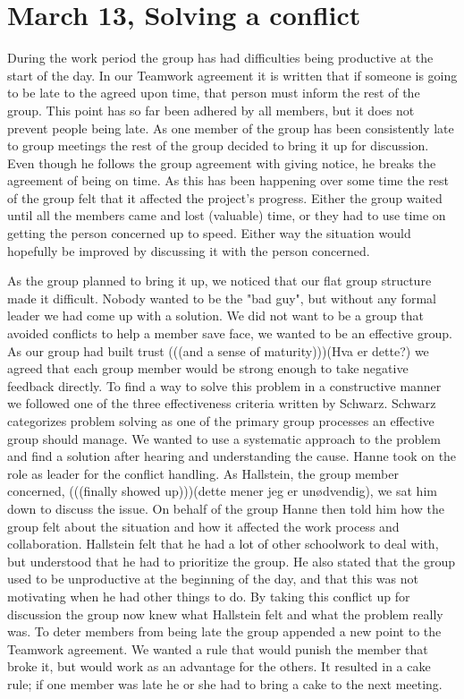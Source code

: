 \section{March 13, Solving a conflict}

During the work period the group has had difficulties being productive at the start of the day. In our Teamwork agreement it is written that if someone is going to be late to the agreed upon time, that person must inform the rest of the group. This point has so far been adhered by all members, but it does not prevent people being late. As one member of the group has been consistently  late to group meetings the rest of the group decided to bring it up for discussion. Even though he follows the group agreement with giving notice, he breaks the agreement of being on time. As this has been happening over some time the rest of the group felt that it affected the project's progress. Either the group waited until all the members came and lost (valuable) time, or they had to use time on getting the person concerned up to speed. Either way the situation would hopefully be improved by discussing it with the person concerned.

As the group planned to bring it up, we noticed that our flat group structure made it difficult. Nobody wanted to be the "bad guy", but without any formal leader we had come up with a solution. We did not want to be a group that avoided conflicts to help a member save face, we wanted to be an effective group. As our group had built trust (((and a sense of maturity)))(Hva er dette?) we agreed that each group member would be strong enough to take negative feedback directly. To find a way to solve this problem in a constructive manner we followed one of the three effectiveness criteria written by Schwarz\cite{WorkGroups}. Schwarz categorizes problem solving as one of the primary group processes an effective group should manage. We wanted to use a systematic approach to the problem and find a solution after hearing and understanding the cause. Hanne took on the role as leader for the conflict handling. As Hallstein, the group member concerned, (((finally showed up)))(dette mener jeg er unødvendig), we sat him down to discuss the issue. On behalf of the group Hanne then told him how the group felt about the situation and how it affected the work process and collaboration. Hallstein felt that he had a lot of other schoolwork to deal with, but understood that he had to prioritize the group. He also stated that the group used to be unproductive at the beginning of the day, and that this was not motivating when he had other things to do. By taking this conflict up for discussion the group now knew what Hallstein felt and what the problem really was. To deter members from being late the group appended a new point to the Teamwork agreement. We wanted a rule that would punish the member that broke it, but would work as an advantage for the others. It resulted in a cake rule; if one member was late he or she had to bring a cake to the next meeting. 

